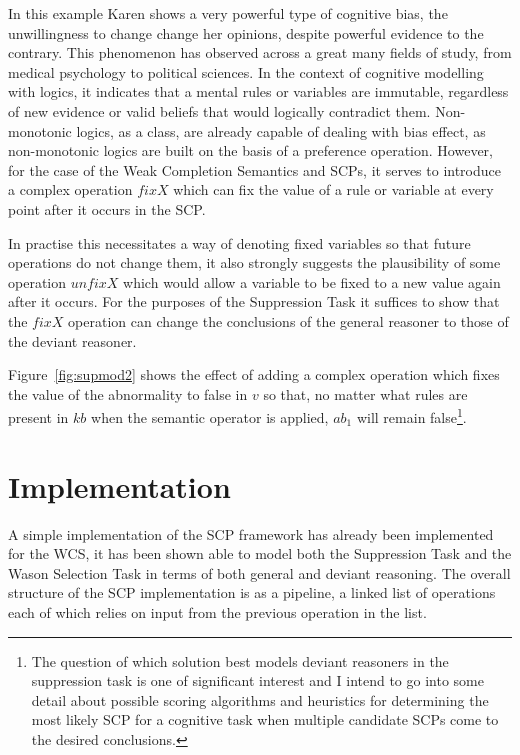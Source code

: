 \documentclass{article}
\begin{document}
In this example Karen shows a very powerful type of cognitive bias, the unwillingness to change change her opinions, despite powerful evidence to the contrary. This phenomenon has observed across a great many fields of study, from medical psychology \citep{brown2010omission} \citep{wroe2005feeling} to political sciences\citep{tappin2017heart}. In the context of cognitive modelling with logics, it indicates that a mental rules or variables are immutable, regardless of new evidence or valid beliefs that would logically contradict them. Non-monotonic logics, as a class, are already capable of dealing with bias effect, as non-monotonic logics are built on the basis of a preference operation. However, for the case of the Weak Completion Semantics and SCPs, it serves to introduce a complex operation $fixX$ which can fix the value of a rule or variable at every point after it occurs in the SCP.

In practise this necessitates a way of denoting fixed variables so that future operations do not change them, it also strongly suggests the plausibility of some operation $unfixX$ which would allow a variable to be fixed to a new value again after it occurs. For the purposes of the Suppression Task it suffices to show that the $fixX$ operation can change the conclusions of the general reasoner to those of the deviant reasoner.

Figure~\ref{fig:supmod2} shows the effect of adding a complex operation which fixes the value of the abnormality to false in $v$ so that, no matter what rules are present in $kb$ when the semantic operator is applied, $ab_1$ will remain false\footnote{The question of which solution best models deviant reasoners in the suppression task is one of significant interest and I intend to go into some detail about possible scoring algorithms and heuristics for determining the most likely SCP for a cognitive task when multiple candidate SCPs come to the desired conclusions.}.

\section{Implementation}
A simple implementation of the SCP framework has already been implemented for the WCS, it has been shown able to model both the Suppression Task and the Wason Selection Task in terms of both general and deviant reasoning. The overall structure of the SCP implementation is as a pipeline, a linked list of operations each of which relies on input from the previous operation in the list.
\end{document}
